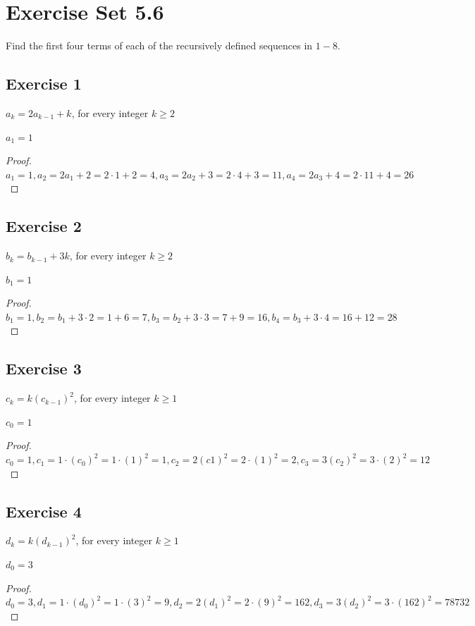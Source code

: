 \documentclass[14pt]{extarticle}
\newcommand{\cy}{\color{cyan}}
\begin{document}
\section{Exercise Set 5.6}

{\cy Find the first four terms of each of the recursively defined sequences in $1-8$.}

\subsection{Exercise 1}
$a_k = 2a_{k - 1} + k$, for every integer $k \geq 2$

$a_1 = 1$

\begin{proof}
$a_1 = 1, a_2 = 2a_1 + 2 = 2 \cdot 1 + 2 = 4, a_3 = 2a_2 + 3 = 2 \cdot 4 + 3 = 11, a_4 = 2a_3 + 4 = 2 \cdot 11 + 4 = 26$
\end{proof}

\subsection{Exercise 2}
$b_k = b_{k - 1} + 3k$, for every integer $k \geq 2$

$b_1 = 1$

\begin{proof}
$b_1 = 1, b_2 = b_1 + 3 \cdot 2 = 1 + 6 = 7, b_3 = b_2 + 3 \cdot 3 = 7 + 9 = 16, b_4 = b_3 + 3 \cdot 4 = 16 + 12 = 28$
\end{proof}

\subsection{Exercise 3}
$c_k = k(c_{k-1})^2$, for every integer $k \geq 1$

$c_0 = 1$

\begin{proof}
$c_0 = 1, c_1 = 1 \cdot (c_0)^2 = 1 \cdot (1)^2 = 1, c_2 = 2(c1)^2 = 2 \cdot (1)^2 = 2, c_3 = 3(c_2)^2 = 3 \cdot (2)^2 = 12$
\end{proof}

\subsection{Exercise 4}
$d_k = k(d_{k - 1})^2$, for every integer $k \geq 1$

$d_0 = 3$

\begin{proof}
$d_0 = 3, d_1 = 1 \cdot (d_0)^2 = 1 \cdot (3)^2 = 9, d_2 = 2(d_1)^2 = 2 \cdot (9)^2 = 162, d_3 = 3(d_2)^2 = 3 \cdot (162)^2 = 78732$
\end{proof}
\end{document}
